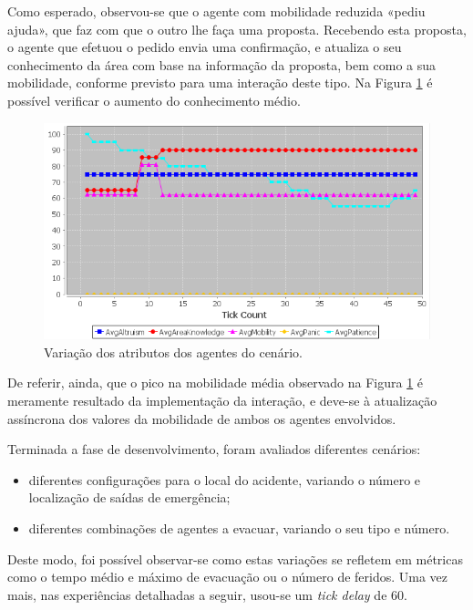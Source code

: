 \documentclass[12pt]{article}
\begin{document}
\begin{titlepage}
\begin{itemize}
Como esperado, observou-se que o agente com mobilidade reduzida «pediu ajuda», que faz com que o outro lhe faça uma proposta. Recebendo esta proposta, o agente que efetuou o pedido envia uma confirmação, e atualiza o seu conhecimento da área com base na informação da proposta, bem como a sua mobilidade, conforme previsto para uma interação deste tipo. Na Figura \ref{help_graph} é possível verificar o aumento do conhecimento médio.

\begin{figure}[H]
	\centering
	\includegraphics{help_test.png}
	\caption{Variação dos atributos dos agentes do cenário.}
	\label{help_graph}
\end{figure}
	
	De referir, ainda, que o pico na mobilidade média observado na Figura \ref{help_graph} é meramente resultado da implementação da interação, e deve-se à atualização assíncrona dos valores da mobilidade de ambos os agentes envolvidos.
	
\end{itemize}


Terminada a fase de desenvolvimento, foram avaliados diferentes cenários:
\begin{itemize}
	\item diferentes configurações para o local do acidente, variando o número e localização de saídas de emergência;
	\item diferentes combinações de agentes a evacuar, variando o seu tipo e número.
\end{itemize}

Deste modo, foi possível observar-se como estas variações se refletem em métricas como o tempo médio e máximo de evacuação ou o número de feridos. Uma vez mais, nas experiências detalhadas a seguir, usou-se um \textit{tick delay} de 60.\newline


\end{titlepage}
\end{document}
